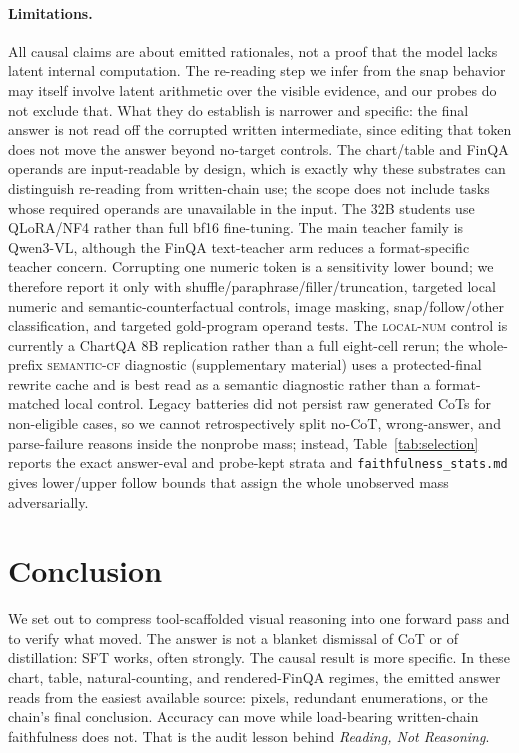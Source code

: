 \documentclass[11pt]{article}
\newcommand{\localnum}{\textsc{local-num}}
\newcommand{\semanticcf}{\textsc{semantic-cf}}
\begin{document}
\paragraph{Limitations.}
All causal claims are about emitted rationales, not a proof that the model lacks latent internal computation. The re-reading step we infer from the snap behavior may itself involve latent arithmetic over the visible evidence, and our probes do not exclude that. What they do establish is narrower and specific: the final answer is not read off the corrupted written intermediate, since editing that token does not move the answer beyond no-target controls. The chart/table and FinQA operands are input-readable by design, which is exactly why these substrates can distinguish re-reading from written-chain use; the scope does not include tasks whose required operands are unavailable in the input. The 32B students use QLoRA/NF4 rather than full bf16 fine-tuning. The main teacher family is Qwen3-VL, although the FinQA text-teacher arm reduces a format-specific teacher concern. Corrupting one numeric token is a sensitivity lower bound; we therefore report it only with shuffle/paraphrase/filler/truncation, targeted local numeric and semantic-counterfactual controls, image masking, snap/follow/other classification, and targeted gold-program operand tests. The \localnum{} control is currently a ChartQA 8B replication rather than a full eight-cell rerun; the whole-prefix \semanticcf{} diagnostic (supplementary material) uses a protected-final rewrite cache and is best read as a semantic diagnostic rather than a format-matched local control. Legacy batteries did not persist raw generated CoTs for non-eligible cases, so we cannot retrospectively split no-CoT, wrong-answer, and parse-failure reasons inside the nonprobe mass; instead, Table~\ref{tab:selection} reports the exact answer-eval and probe-kept strata and \texttt{faithfulness\_stats.md} gives lower/upper follow bounds that assign the whole unobserved mass adversarially.

\section{Conclusion}
\label{sec:conclusion}

We set out to compress tool-scaffolded visual reasoning into one forward pass and to verify what moved. The answer is not a blanket dismissal of CoT or of distillation: SFT works, often strongly. The causal result is more specific. In these chart, table, natural-counting, and rendered-FinQA regimes, the emitted answer reads from the easiest available source: pixels, redundant enumerations, or the chain's final conclusion. Accuracy can move while load-bearing written-chain faithfulness does not. That is the audit lesson behind \emph{Reading, Not Reasoning}.
\end{document}
